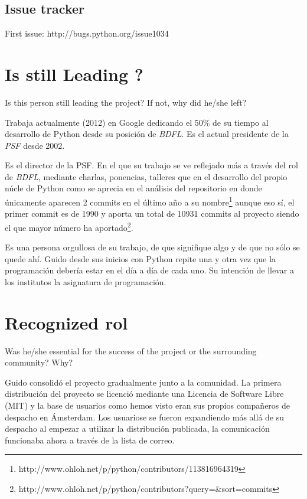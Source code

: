 \documentclass[11pt]{scrartcl}
\begin{document}
\subsection{Issue tracker}

First issue: http://bugs.python.org/issue1034

\section{Is still Leading ?}

Is this person still leading the project? If not, why did he/she left?

Trabaja actualmente (2012) en Google dedicando el 50\% de su tiempo al desarrollo de Python desde su posición de \emph{BDFL}. Es el actual presidente de la \emph{PSF} desde 2002.

Es el director de la PSF. En el que su trabajo se ve reflejado más a través del rol de \emph{BDFL}, mediante charlas, ponencias, talleres que en el desarrollo del propio núcle de Python como se aprecia en el análisis del repositorio en donde únicamente aparecen 2 commits en el último año a su nombre\footnote{http://www.ohloh.net/p/python/contributors/113816964319} aunque eso sí, el primer commit es de 1990 y aporta un total de 10931 commits al proyecto siendo el que mayor número ha aportado\footnote{http://www.ohloh.net/p/python/contributors?query=\&sort=commits}.

Es una persona orgullosa de su trabajo, de que signifique algo y de que no sólo se quede ahí. Guido desde sus inicios con Python repite una y otra vez que la programación debería estar en el día a día de cada uno. Su intención de llevar a los institutos la asignatura de programación.

\section{Recognized rol}

Was he/she essential for the success of the project or the surrounding community? Why?

Guido consolidó el proyecto gradualmente junto a la comunidad. La primera distribución del proyecto se licenció mediante una Licencia de Software Libre (MIT) y la base de usuarios como hemos visto eran sus propios compañeros de despacho en Ámsterdam. Los usuariose se fueron expandiendo más allá de su despacho al empezar a utilizar la distribución publicada, la comunicación funcionaba ahora a través de la lista de correo.
\end{document}
